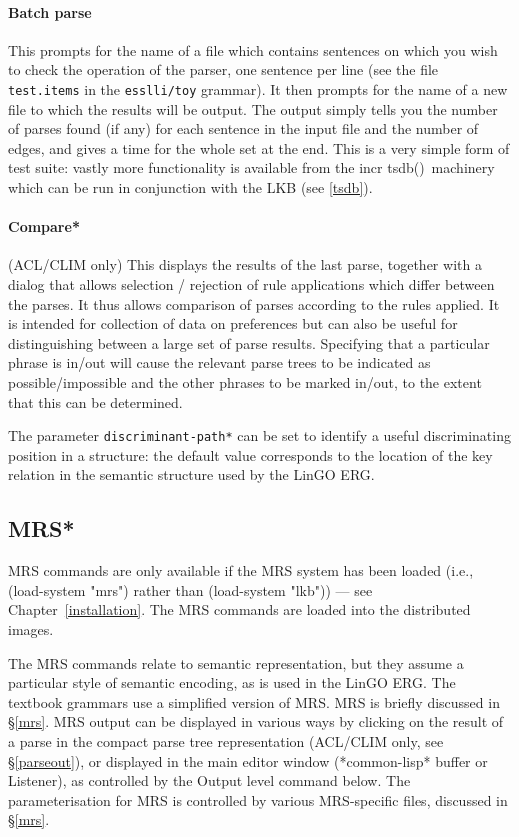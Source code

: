 \documentclass[12pt]{report}
\newcommand{\itsdb}{{\sf \lbrack incr tsdb()\rbrack}}
\newcommand{\filename}[1]{{\tt #1}}
\newcommand{\lkbparam}[1]{{\tt #1}}
\newcommand{\lkbmenucommand}{{\bf}}
\begin{document}
\paragraph{Batch parse}
This prompts for the name of a file which contains sentences
on which you wish to check the operation of the parser,
one sentence per line (see the file \filename{test.items} in the
\filename{esslli/toy} grammar).  It then prompts for the name of a new file
to which the results will be output.  
The output simply tells you
the number of parses found (if any) for each sentence in the
input file and the number
of edges, and gives a time for the whole set at the end.
This is a very simple form of test suite: vastly 
more functionality is available from the \itsdb\ machinery which
can be run in conjunction with the LKB (see \ref{tsdb}).

\paragraph{Compare*}
(ACL/CLIM only)
This displays the results of the last parse, together with a dialog that 
allows selection / rejection of rule applications which differ between 
the parses.
It thus allows comparison of parses according to the rules applied.
It is intended for collection of data on preferences
but can also be useful for distinguishing between a large set of
parse results.  Specifying that a particular phrase is in/out will 
cause the relevant parse trees to be indicated as possible/impossible
and the other phrases to be marked in/out, to the extent that this can
be determined.  

The parameter \lkbparam{*discriminant-path*} can be set to
identify a useful discriminating position in a structure: the
default value corresponds to the location of the key relation
in the semantic structure used by the LinGO ERG.

\subsection{MRS*}
\label{mrsmenu}

MRS commands are only available if the MRS system has been loaded
(i.e., (load-system "mrs") rather than (load-system "lkb")) --- see
Chapter~\ref{installation}.  The MRS commands are loaded into the 
distributed images.

The MRS commands relate to semantic representation, but they assume 
a particular style of semantic encoding, as is used in the LinGO ERG.
The textbook grammars use a simplified version of MRS.  MRS is 
briefly discussed in \S\ref{mrs}.  MRS output can be displayed in
various ways by clicking on the result of a parse in the compact parse tree
representation (ACL/CLIM only, see \S\ref{parseout}), 
or displayed in the main editor window
(*common-lisp* buffer or Listener), as controlled by the 
{\lkbmenucommand Output level}
command below.  The parameterisation for MRS is 
controlled by various MRS-specific files,
discussed in \S\ref{mrs}.
\end{document}
